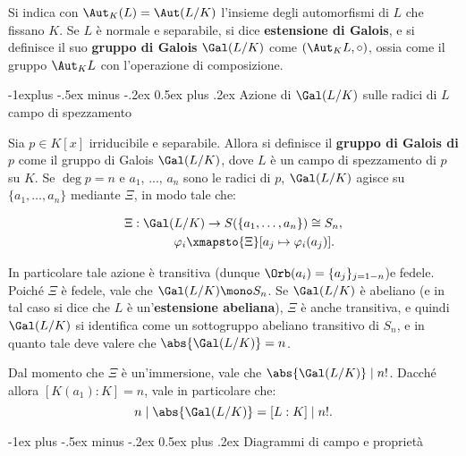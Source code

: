 \documentclass[10pt,landscape]{article}
\makeatletter
\renewcommand{\section}{\@startsection{section}{1}{0mm}%
	{-1ex plus -.5ex minus -.2ex}%
	{0.5ex plus .2ex}%
	{\normalfont\large\bfseries}}
\renewcommand{\subsection}{\@startsection{subsection}{2}{0mm}%
	{-1explus -.5ex minus -.2ex}%
	{0.5ex plus .2ex}%
	{\normalfont\normalsize\bfseries}}
\makeatother
\begin{document}
\begin{multicols}{3}
		
		Si indica con $\Aut_K(L) = \Aut(L / K)$ l'insieme
		degli automorfismi di $L$ che fissano $K$. Se
		$L$ è normale e separabile, si dice
		\textbf{estensione di Galois}, e si definisce
		il suo \textbf{gruppo di Galois}
		$\Gal(L / K)$ come $(\Aut_K L, \circ)$, ossia come
		il gruppo $\Aut_K L$ con l'operazione di
		composizione.
		
		
		\subsection{Azione di $\Gal(L / K)$ sulle radici di $L$ campo di spezzamento}
		
		Sia $p \in K[x]$ irriducibile e separabile.
		Allora si definisce
		il \textbf{gruppo di Galois di $p$} come il gruppo
		di Galois $\Gal(L / K)$, dove $L$ è un campo di
		spezzamento di $p$ su $K$. Se $\deg p = n$ e
		$a_1$, ..., $a_n$ sono le radici di $p$,
		$\Gal(L / K)$ agisce su $\{a_1, \ldots, a_n\}$
		mediante $\Xi$, in modo tale che:
		
		\begin{equation*}
		\begin{split}
			\Xi : \Gal(&L / K) \to S(\{a_1, \ldots, a_n\}) \cong S_n, \\
			&\varphi_i \xmapsto{\Xi} [a_j \mapsto \varphi_i(a_j)].
		\end{split}
		\end{equation*}

		In particolare tale azione è transitiva (dunque $\Orb(a_i) = \{a_j\}_{j=1-n}$)e fedele. Poiché $\Xi$ è fedele, vale che
		$\Gal(L / K) \mono S_n$. Se $\Gal(L / K)$ è abeliano
		(e in tal caso si dice che $L$ è un'\textbf{estensione abeliana}), $\Xi$ è anche transitiva, e quindi
		$\Gal(L / K)$ si identifica come un sottogruppo
		abeliano transitivo di $S_n$, e in quanto tale deve
		valere che $\abs{\Gal(L / K)} = n$. \medskip


		
		Dal momento che $\Xi$ è un'immersione, vale
		che $\abs{\Gal(L / K)} \mid n!$. Dacché allora
		$[K(a_1) : K] = n$, vale in particolare che:
		\[ n \mid \abs{\Gal(L / K)} = [L : K] \mid n!. \]
		
		
		\section{Diagrammi di campo e proprietà}
		

\end{multicols}
\end{document}
